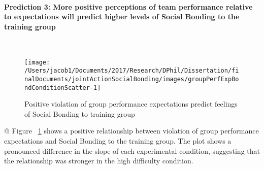 \documentclass[english]{article}\usepackage[]{graphicx}\usepackage[]{color}
\makeatletter
\def\maxwidth{ %
  \ifdim\Gin@nat@width>\linewidth
    \linewidth
  \else
    \Gin@nat@width
  \fi
}
\newenvironment{kframe}{%
 \def\at@end@of@kframe{}%
 \ifinner\ifhmode%
  \def\at@end@of@kframe{\end{minipage}}%
  \begin{minipage}{\columnwidth}%
 \fi\fi%
 \def\FrameCommand##1{\hskip\@totalleftmargin \hskip-\fboxsep
 \colorbox{shadecolor}{##1}\hskip-\fboxsep
     \hskip-\linewidth \hskip-\@totalleftmargin \hskip\columnwidth}%
 \MakeFramed {\advance\hsize-\width
   \@totalleftmargin\z@ \linewidth\hsize
   \@setminipage}}%
 {\par\unskip\endMakeFramed%
 \at@end@of@kframe}
\newenvironment{knitrout}{}{} %
\newcommand{\myparagraph}[1]{\paragraph{#1}\mbox{}\\}
\makeatother
\begin{document}
\myparagraph{Prediction 3: More positive perceptions of team performance relative to expectations will predict higher levels of Social Bonding to the training group}


\begin{knitrout}
\color{fgcolor}\begin{kframe}


{\ttfamily\noindent\itshape\color{messagecolor}{\#\# Saving 3.5 x 3.5 in image}}

{\ttfamily\noindent\color{warningcolor}{\#\# Warning: Removed 1 rows containing non-finite values (stat\_smooth).}}

{\ttfamily\noindent\color{warningcolor}{\#\# Warning: Removed 1 rows containing missing values (geom\_point).}}

{\ttfamily\noindent\color{warningcolor}{\#\# Warning: Removed 1 rows containing non-finite values (stat\_smooth).}}

{\ttfamily\noindent\color{warningcolor}{\#\# Warning: Removed 1 rows containing missing values (geom\_point).}}\end{kframe}\begin{figure}

{\centering \texttt{[image: /Users/jacob1/Documents/2017/Research/DPhil/Dissertation/finalDocuments/jointActionSocialBonding/images/groupPerfExpBondConditionScatter-1]} 

}

\caption[Positive violation of group performance expectations 
 predict feelings of Social Bonding to training group]{Positive violation of group performance expectations 
 predict feelings of Social Bonding to training group}\label{fig:groupPerfExpBondConditionScatter}
\end{figure}


\end{knitrout}

@
Figure ~\ref{fig:groupPerfExpBondConditionScatter} shows a positive relationship between violation of group performance expectations and Social Bonding to the training group.  The plot shows a pronounced difference in the slope of each experimental condition, suggesting that the relationship was stronger in the high difficulty condition.
\end{document}
